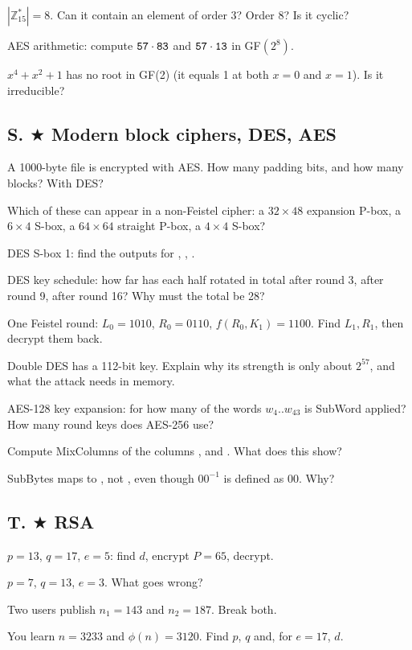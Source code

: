 \q $|\mathbb{Z}_{15}^*| = 8$. Can it contain an element of order 3? Order 8? Is it cyclic?

\q AES arithmetic: compute $\texttt{57} \cdot \texttt{83}$ and $\texttt{57} \cdot \texttt{13}$ in GF$(2^8)$.

\q $x^4 + x^2 + 1$ has no root in GF(2) (it equals 1 at both $x = 0$ and $x = 1$). Is it irreducible?

\subsection*{S. $\bigstar$ Modern block ciphers, DES, AES}
\q A 1000-byte file is encrypted with AES. How many padding bits, and how many blocks? With DES?

\q Which of these can appear in a non-Feistel cipher: a $32 \times 48$ expansion P-box, a $6 \times 4$ S-box, a $64 \times 64$ straight P-box, a $4 \times 4$ S-box?

\q DES S-box 1: find the outputs for , , .

\q DES key schedule: how far has each half rotated in total after round 3, after round 9, after round 16? Why must the total be 28?

\q One Feistel round: $L_0 = 1010$, $R_0 = 0110$, $f(R_0, K_1) = 1100$. Find $L_1, R_1$, then decrypt them back.

\q Double DES has a 112-bit key. Explain why its strength is only about $2^{57}$, and what the attack needs in memory.

\q AES-128 key expansion: for how many of the words $w_4..w_{43}$ is SubWord applied? How many round keys does AES-256 use?

\q Compute MixColumns of the columns \ttx{[01 01 01 01]}, \ttx{[C6 C6 C6 C6]} and \ttx{[01 00 00 00]}. What does this show?

\q SubBytes maps  to , not , even though $00^{-1}$ is defined as $00$. Why?

\subsection*{T. $\bigstar$ RSA}
\q $p = 13$, $q = 17$, $e = 5$: find $d$, encrypt $P = 65$, decrypt.

\q $p = 7$, $q = 13$, $e = 3$. What goes wrong?

\q Two users publish $n_1 = 143$ and $n_2 = 187$. Break both.

\q You learn $n = 3233$ and $\phi(n) = 3120$. Find $p$, $q$ and, for $e = 17$, $d$.

